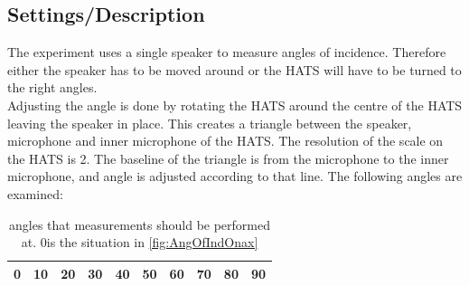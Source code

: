 \subsection{Settings/Description}
The experiment uses a single speaker to measure angles of incidence. Therefore either the speaker has to be moved around or the HATS will have to be turned to the right angles. \\
Adjusting the angle is done by rotating the HATS around the centre of the HATS leaving the speaker in place. This creates a triangle between the speaker, microphone and inner microphone of the HATS. The resolution of the scale on the HATS is 2\textdegree. The baseline of the triangle is from the microphone to the inner microphone, and angle is adjusted according to that line.
The following angles are examined:
\begin{table}[H]
	\centering
	\begin{tabular}{c c c c c c c c c c} \toprule
		0 & 10 & 20 & 30 & 40 & 50 & 60 & 70 & 80 & 90 \\ \bottomrule
	\end{tabular}
\label{Tab:AngleOfInciMeasAngles}
\caption{angles that measurements should be performed at. 0\textdegree is the situation in \autoref{fig:AngOfIndOnax}}
\end{table}
 

